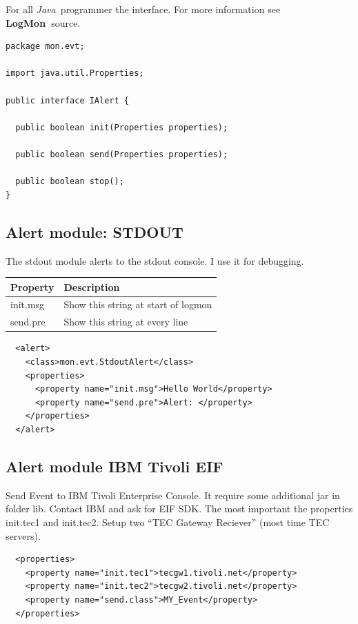 \documentclass[11pt,a4paper]{article}
\newcommand{\logmon}{\textbf{LogMon\ }}
\newcommand{\java}{\textit{Java\ }}
\begin{document}
For all \java programmer the interface. For more information see \logmon source.

\begin{samepage}


\begin{verbatim}
package mon.evt;

import java.util.Properties;

public interface IAlert {

  public boolean init(Properties properties);

  public boolean send(Properties properties);

  public boolean stop();
}

\end{verbatim}
\end{samepage}


\subsection{Alert module: STDOUT}

The stdout module alerts to the stdout console. I use it for debugging.

\begin{tabular}{l|p{}}
  Property 	& Description\\\hline
  init.msg 	& Show this string at start of logmon\\
  send.pre 	& Show this string at every line\\
\end{tabular}

\begin{verbatim}
  <alert>
    <class>mon.evt.StdoutAlert</class>
    <properties>
      <property name="init.msg">Hello World</property>
      <property name="send.pre">Alert: </property>
    </properties>
  </alert>
\end{verbatim}

\subsection{Alert module IBM Tivoli EIF}
\label{sec:eif}

Send Event to IBM Tivoli Enterprise Console. It require some additional jar in
folder lib. Contact IBM and ask for EIF SDK. The most important the properties
init.tec1 and init.tec2. Setup two ``TEC Gateway Reciever'' (most time TEC
servers).

\begin{verbatim}
  <properties>
    <property name="init.tec1">tecgw1.tivoli.net</property>
    <property name="init.tec2">tecgw2.tivoli.net</property>
    <property name="send.class">MY_Event</property>
  </properties>
\end{verbatim}
\end{document}
